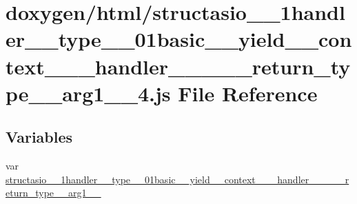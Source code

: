 \hypertarget{structasio__1__1handler____type__3__01basic____yield____context__3__01__handler__01__4__00__01__d198685a7a8ac1b4ca90620e2e3142fa}{}\section{doxygen/html/structasio\+\_\+\_\+1handler\+\_\+\+\_\+type\+\_\+\_\+01basic\+\_\+\+\_\+yield\+\_\+\+\_\+context\+\_\+\_\+\_\+handler\+\_\+\_\+\_\+\_\+\_\+return\+\_\+type\+\_\+\_\+arg1\+\_\+\_\+4.js File Reference}
\label{structasio__1__1handler____type__3__01basic____yield____context__3__01__handler__01__4__00__01__d198685a7a8ac1b4ca90620e2e3142fa}
\subsection*{Variables}
\begin{DoxyCompactItemize}
\item 
var \hyperlink{structasio__1__1handler____type__3__01basic____yield____context__3__01__handler__01__4__00__01__d198685a7a8ac1b4ca90620e2e3142fa_a72d9b1b4f36bbebf2112ad44bb002327}{structasio\+\_\+\_\+1handler\+\_\+\+\_\+type\+\_\+\_\+01basic\+\_\+\+\_\+yield\+\_\+\+\_\+context\+\_\+\_\+\_\+handler\+\_\+\_\+\_\+\_\+\_\+return\+\_\+type\+\_\+\_\+arg1\+\_\+\_}
\end{DoxyCompactItemize}


